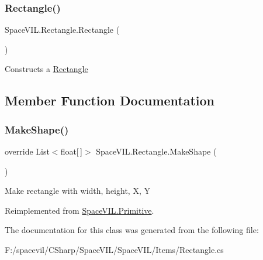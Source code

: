 \subsubsection{\texorpdfstring{Rectangle()}{Rectangle()}}
{\footnotesize\ttfamily Space\+V\+I\+L.\+Rectangle.\+Rectangle (\begin{DoxyParamCaption}{ }\end{DoxyParamCaption})}



Constructs a \mbox{\hyperlink{class_space_v_i_l_1_1_rectangle}{Rectangle}} 



\subsection{Member Function Documentation}
\mbox{\label{class_space_v_i_l_1_1_rectangle_acc0a5018e266efaa750459bb875eb805}} 
\subsubsection{\texorpdfstring{Make\+Shape()}{MakeShape()}}
{\footnotesize\ttfamily override List$<$float\mbox{[}$\,$\mbox{]}$>$ Space\+V\+I\+L.\+Rectangle.\+Make\+Shape (\begin{DoxyParamCaption}{ }\end{DoxyParamCaption})\hspace{0.3cm}{\ttfamily [virtual]}}



Make rectangle with width, height, X, Y 



Reimplemented from \mbox{\hyperlink{class_space_v_i_l_1_1_primitive_a4e7ed3f8d9e28e0063c36f4f2bf470cd}{Space\+V\+I\+L.\+Primitive}}.



The documentation for this class was generated from the following file\+:\begin{DoxyCompactItemize}
\item 
F\+:/spacevil/\+C\+Sharp/\+Space\+V\+I\+L/\+Space\+V\+I\+L/\+Items/Rectangle.\+cs\end{DoxyCompactItemize}
